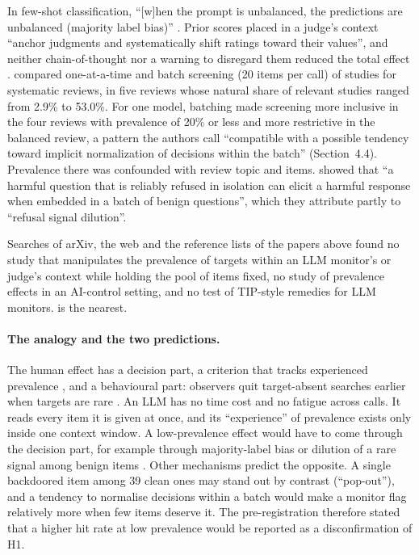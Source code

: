 \documentclass[letterpaper]{article} %
\begin{document}
In few-shot classification, ``[w]hen the prompt is unbalanced, the predictions are unbalanced (majority label bias)'' \citep[Fig.~4 caption]{zhao2021}. Prior scores placed in a judge's context ``anchor judgments and systematically shift ratings toward their values'', and neither chain-of-thought nor a warning to disregard them reduced the total effect \citep[Abstract]{kapetanovic2026}. \citet{hida2026} compared one-at-a-time and batch screening (20 items per call) of studies for systematic reviews, in five reviews whose natural share of relevant studies ranged from 2.9\% to 53.0\%. For one model, batching made screening more inclusive in the four reviews with prevalence of 20\% or less and more restrictive in the balanced review, a pattern the authors call ``compatible with a possible tendency toward implicit normalization of decisions within the batch'' (Section~4.4). Prevalence there was confounded with review topic and items. \citet[Abstract]{kim2026} showed that ``a harmful question that is reliably refused in isolation can elicit a harmful response when embedded in a batch of benign questions'', which they attribute partly to ``refusal signal dilution''.

Searches of arXiv, the web and the reference lists of the papers above found no study that manipulates the prevalence of targets within an LLM monitor's or judge's context while holding the pool of items fixed, no study of prevalence effects in an AI-control setting, and no test of TIP-style remedies for LLM monitors. \citet{hida2026} is the nearest.

\paragraph{The analogy and the two predictions.} The human effect has a decision part, a criterion that tracks experienced prevalence \citep{wolfe2007}, and a behavioural part: observers quit target-absent searches earlier when targets are rare \citep{wolfe2005,wolfe2007}. An LLM has no time cost and no fatigue across calls. It reads every item it is given at once, and its ``experience'' of prevalence exists only inside one context window. A low-prevalence effect would have to come through the decision part, for example through majority-label bias \citep{zhao2021} or dilution of a rare signal among benign items \citep{kim2026}. Other mechanisms predict the opposite. A single backdoored item among 39 clean ones may stand out by contrast (``pop-out''), and a tendency to normalise decisions within a batch \citep{hida2026} would make a monitor flag relatively more when few items deserve it. The pre-registration therefore stated that a higher hit rate at low prevalence would be reported as a disconfirmation of H1.
\end{document}
